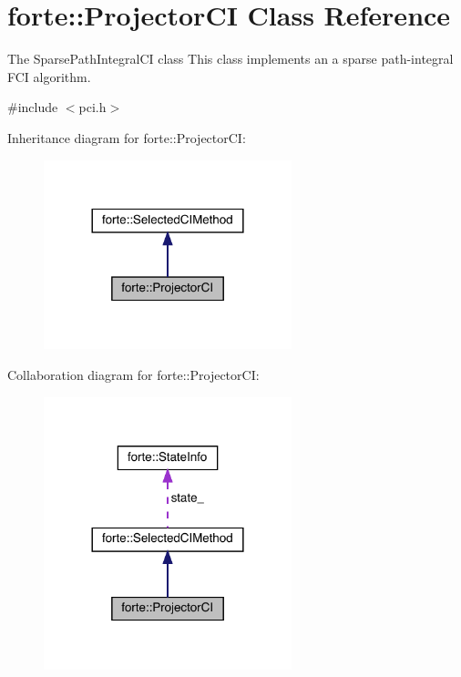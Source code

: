 \hypertarget{classforte_1_1_projector_c_i}{}\section{forte\+:\+:Projector\+CI Class Reference}
\label{classforte_1_1_projector_c_i}


The Sparse\+Path\+Integral\+CI class This class implements an a sparse path-\/integral F\+CI algorithm.  




{\ttfamily \#include $<$pci.\+h$>$}



Inheritance diagram for forte\+:\+:Projector\+CI\+:
\nopagebreak
\begin{figure}[H]
\begin{center}
\leavevmode
\includegraphics[width=204pt]{classforte_1_1_projector_c_i__inherit__graph}
\end{center}
\end{figure}


Collaboration diagram for forte\+:\+:Projector\+CI\+:
\nopagebreak
\begin{figure}[H]
\begin{center}
\leavevmode
\includegraphics[width=204pt]{classforte_1_1_projector_c_i__coll__graph}
\end{center}
\end{figure}
